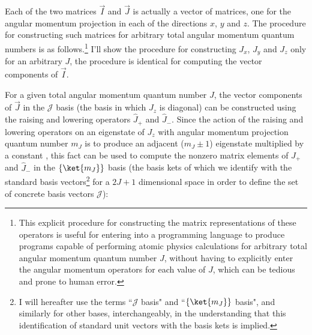 Each of the two matrices $\vec I$ and $\vec J$ is actually a vector of matrices, one for the angular momentum projection in each of the directions $x$, $y$ and $z$. The procedure for constructing such matrices for arbitrary total angular momentum quantum numbers is as follows.\footnote{This explicit procedure for constructing the matrix representations of these operators is useful for entering into a programming language to produce programs capable of performing atomic physics calculations for arbitrary total angular momentum quantum number $J$, without having to explicitly enter the angular momentum operators for each value of $J$, which can be tedious and prone to human error.} I'll show the procedure for constructing $J_x$, $J_y$ and $J_z$ only for an arbitrary $J$, the procedure is identical for computing the vector components of $\vec I$.

For a given total angular momentum quantum number $J$, the vector components of $\vec J$ in the $\mathcal{J}$ basis (the basis in which $J_z$ is diagonal) can be constructed using the raising and lowering operators $\hat J_+$ and $\hat J_-$. Since the action of the raising and lowering operators on an eigenstate of $J_z$ with angular momentum projection quantum number $m_J$ is to produce an adjacent ($m_J \pm 1$) eigenstate multiplied by a constant \cite[p 192]{sakurai_modern_1994}, this fact can be used to compute the nonzero matrix elements of $\hat J_+$ and $\hat J_-$ in the $\{\ket{m_J}\}$ basis (the basis kets of which we identify with the standard basis vectors\footnote{I will hereafter use the terms ``$\mathcal{J}$ basis" and ``$\{\ket{m_J}\}$ basis", and similarly for other bases, interchangeably, in the understanding that this identification of standard unit vectors with the basis kets is implied.} for a $2J+1$ dimensional space in order to define the set of concrete basis vectors $\mathcal{J}$):

